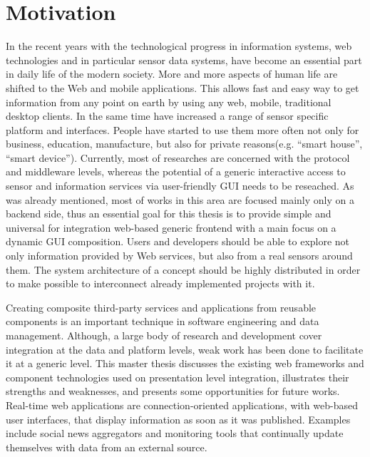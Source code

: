 \section{Motivation}
     In the recent years with the technological progress in information systems, web technologies and in particular sensor data systems, have become an essential part in daily life of the modern society. More and more aspects of human life are shifted to the Web and mobile applications. This allows fast and easy way to get information from any point on earth by using any web, mobile, traditional desktop clients. In the same time have increased a range of sensor specific platform and interfaces. People have started to use them more often not only for business, education, manufacture, but also for private reasons(e.g. ``smart house'', ``smart device''). Currently, most of researches are concerned with the protocol and middleware levels, whereas the potential of a generic interactive access to sensor and information services via user-friendly GUI  needs to be reseached. As was already mentioned, most of works in this area are focused mainly only on a backend side, thus an essential goal for this thesis is to provide simple and universal for integration web-based generic frontend with a main focus on a dynamic GUI composition. Users and developers should be able to explore not only information provided by Web services, but also from a real sensors around them. The system architecture of a concept should be highly distributed in order to make possible to interconnect already implemented projects with it.

     Creating composite third-party services and applications from reusable components is an important technique in software engineering and data management. Although, a large body of research and development cover integration at the data and platform levels, weak work has been done to facilitate it at a generic level. This master thesis discusses the existing web frameworks and component technologies used on presentation level integration, illustrates their strengths and weaknesses, and presents some opportunities for future works. Real-time web applications are connection-oriented applications, with web-based user interfaces, that display information as soon as it was published. Examples include social news aggregators and monitoring tools that continually update themselves with data from an external source.

